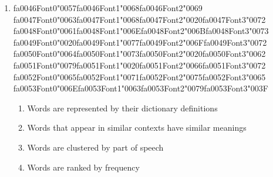 \documentclass[12pt]{article}
\begin{document}
\begin{enumerate}[label=Q\arabic*.]
\item {\csname fa0046Font0\endcsname\char"0057}{\csname fa0046Font1\endcsname\char"0068}{\csname fa0046Font2\endcsname\char"0069} {\csname fa0047Font0\endcsname\char"0063}{\csname fa0047Font1\endcsname\char"0068}{\csname fa0047Font2\endcsname\char"0020}{\csname fa0047Font3\endcsname\char"0072} {\csname fa0048Font0\endcsname\char"0061}{\csname fa0048Font1\endcsname\char"006E}{\csname fa0048Font2\endcsname\char"006B}{\csname fa0048Font3\endcsname\char"0073} {\csname fa0049Font0\endcsname\char"0020}{\csname fa0049Font1\endcsname\char"0077}{\csname fa0049Font2\endcsname\char"006F}{\csname fa0049Font3\endcsname\char"0072} {\csname fa0050Font0\endcsname\char"0064}{\csname fa0050Font1\endcsname\char"0073}{\csname fa0050Font2\endcsname\char"0020}{\csname fa0050Font3\endcsname\char"0062} {\csname fa0051Font0\endcsname\char"0079}{\csname fa0051Font1\endcsname\char"0020}{\csname fa0051Font2\endcsname\char"0066}{\csname fa0051Font3\endcsname\char"0072} {\csname fa0052Font0\endcsname\char"0065}{\csname fa0052Font1\endcsname\char"0071}{\csname fa0052Font2\endcsname\char"0075}{\csname fa0052Font3\endcsname\char"0065} {\csname fa0053Font0\endcsname\char"006E}{\csname fa0053Font1\endcsname\char"0063}{\csname fa0053Font2\endcsname\char"0079}{\csname fa0053Font3\endcsname\char"003F}
\begin{enumerate}[label=(\Alph*)]
    \item Words are represented by their dictionary definitions
    \item Words that appear in similar contexts have similar meanings
    \item Words are clustered by part of speech
    \item Words are ranked by frequency
\end{enumerate}

\end{enumerate}
\end{document}
